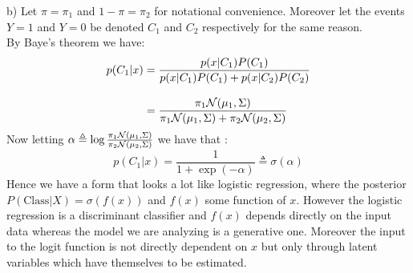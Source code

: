 b) Let $\pi = \pi_1$ and $1-\pi = \pi_2$ for notational convenience. Moreover let the events
$Y=1$ and $Y=0$ be denoted $C_1$ and $C_2$ respectively for the same reason.\\
By Baye's theorem we have:
\begin{align}
    p(C_1 \vert x) &= \frac{p(x\vert C_1)P(C_1)}{p(x\vert C_1)P(C_1) + p(x\vert C_2)P(C_2)}\\[2ex]
		   &= \frac{\pi_1 \mathcal{N} (\mu_1, \Sigma) }{\pi_1 \mathcal{N} (\mu_1, \Sigma) 
			    +\pi_2 \mathcal{N} (\mu_2, \Sigma) }
\end{align}
Now letting $ \alpha \triangleq \log \frac{\pi_1 \mathcal{N} (\mu_1, \Sigma)}{\pi_2 \mathcal{N} (\mu_2, \Sigma) }$
we have that :
\begin{equation}
p(C_1 \vert x) = \frac{1}{1+\exp(-\alpha)} \triangleq \sigma (\alpha)
\end{equation}
Hence we have a form that looks a lot like logistic regression, where the posterior
$P(\mathrm {Class} \vert X) = \sigma (f(x))$ and $f(x)$ some function of $x$. However
the logistic regression is a discriminant classifier and $f(x)$ depends directly on 
the input data whereas the model we are analyzing is a generative one. Moreover the input
to the logit function is not directly dependent on $x$ but only through latent variables
which have themselves to be estimated.





